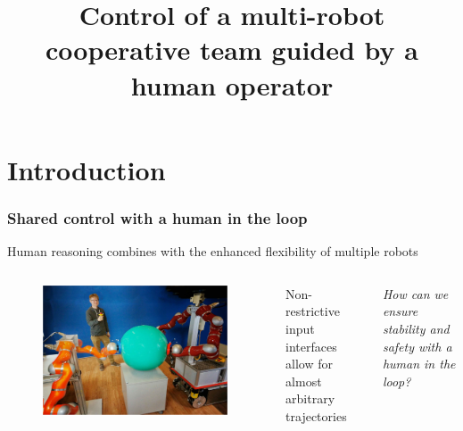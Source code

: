 \documentclass[student]{ITRslides}
\title{Control of a multi-robot cooperative team guided by a human operator}
\begin{document}
\begin{frame}
    \titlepage
\end{frame}


\section{Introduction}

\begin{frame}
	\frametitle{Shared control with a human in the loop}
	Human reasoning combines with the enhanced flexibility of multiple robots 
		\begin{columns}[T]
	
			\begin{figure}
			\centering
			\includegraphics[width=0.98\textwidth]{handcontrol.jpg}
			\end{figure}
		
		\vspace{10pt}
		Non-restrictive input interfaces allow for almost arbitrary trajectories\\
		\begin{block}{}
			\textit{How can we ensure stability and safety with a human in the loop?}
		\end{block}
		
			
			\end{columns}
\end{frame}
\end{document}
